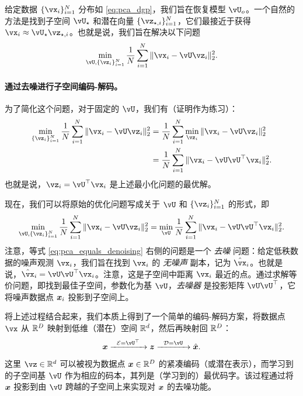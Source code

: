 \documentclass[../../book-main_zh.tex]{subfiles}
\begin{document}
给定数据 \(\{\vx_{i}\}_{i = 1}^{N}\) 分布如 \eqref{eq:pca_dgp}，我们旨在恢复模型 \(\vU_{o}\)。一个自然的方法是找到子空间 \(\vU_{\star}\) 和潜在向量 \(\{\vz_{\star, i}\}_{i = 1}^{N}\)，它们最接近于获得 \(\vx_{i} \approx \vU_{\star}\vz_{\star, i}\)。也就是说，我们旨在解决以下问题
\begin{equation}\label{eq:pca_sparse_recovery_problem}
    \min_{\vU, \{\vz_{i}\}_{i = 1}^{N}}\frac{1}{N}\sum_{i = 1}^{N}\norm{\vx_{i} - \vU\vz_{i}}_{2}^{2}.
\end{equation}

\paragraph{通过去噪进行子空间编码-解码。}
为了简化这个问题，对于固定的 \(\vU\)，我们有（证明作为练习）：
\begin{align*}
    \min_{\{\vz_{i}\}_{i = 1}^{N}}\frac{1}{N}\sum_{i = 1}^{N}\norm{\vx_{i} - \vU\vz_{i}}_{2}^{2} 
    &= \frac{1}{N}\sum_{i = 1}^{N}\min_{\vz_{i}}\norm{\vx_{i} - \vU\vz_{i}}_{2}^{2} \\
    &= \frac{1}{N}\sum_{i = 1}^{N}\norm{\vx_{i} - \vU\vU^{\top}\vx_{i}}_{2}^{2}. 
\end{align*}
也就是说，\(\vz_i = \vU^\top\vx_i\) 是上述最小化问题的最优解。

现在，我们可以将原始的优化问题写成关于 \(\vU\) 和 \(\{\vz_{i}\}_{i = 1}^{N}\) 的形式，即
\begin{equation}\label{eq:pca_equals_denoising}
    \min_{\vU, \{\vz_{i}\}_{i = 1}^{N}}\frac{1}{N}\sum_{i = 1}^{N}\norm{\vx_{i} - \vU\vz_{i}}_{2}^{2} = \min_{\vU}\frac{1}{N}\sum_{i = 1}^{N}\norm{\vx_{i} - \vU\vU^{\top}\vx_{i}}_{2}^{2}.
\end{equation}
注意，等式 \eqref{eq:pca_equals_denoising} 右侧的问题是一个 \textit{去噪} 问题：给定低秩数据的噪声观测 \(\vx_{i}\)，我们旨在找到 \(\vx_{i}\) 的 \textit{无噪声} 副本，记为 $\hat{\vx}_i$。也就是说，$\hat{\vx}_i = \vU\vU^\top \vx_i$。注意，这是子空间中距离 $\vx_i$ 最近的点。通过求解等价问题，即找到最佳子空间，参数化为基 \(\vU\)，\textit{去噪器} 是投影矩阵 \(\vU\vU^{\top}\)，它将噪声数据点 $\bm{x}_i$ 投影到子空间上。%

将上述过程结合起来，我们本质上得到了一个简单的编码-解码方案，将数据点 $\vx$ 从 $\mathbb{R}^D$ 映射到低维（潜在）空间 $\mathbb{R}^d$，然后再映射回 $\mathbb{R}^D$：
\begin{equation}
\x \xrightarrow{\hspace{2mm} \mathcal{E} = \vU^\top \hspace{2mm}}  \z \xrightarrow{\hspace{2mm} \mathcal{D} = \vU \hspace{2mm}}   \hat{\x}.  
\label{eqn:autoencoding-PCA}
\end{equation}
这里 $\vz \in \R^d$ 可以被视为数据点  $\bm{x} \in \mathbb{R}^D$ 的紧凑编码（或潜在表示），而学习到的子空间基 $\vU$ 作为相应的码本，其列是（学习到的）最优码字。该过程通过将 $\bm{x}$ 投影到由 $\vU$ 跨越的子空间上来实现对 $\bm{x}$ 的去噪功能。
\end{document}
